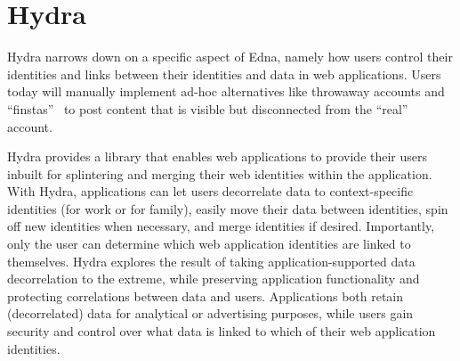 \begin{comment}

Edna is complementary to existing data protection mechanisms. For example, we
combine Edna with an encrypted database to achieve stronger guarantees.
Ednacrypt simultaneously protects against database server compromises even for
unsealed data and adds Edna's protections for sealed data to encrypted
databases, which have no built-in support for removing sensitive data without
breaking the application.

To investigate the need for Edna as a new system, we tried to realize Edna's
functionality atop Qapla~\cite{qapla}, a framework that rewrites SQL queries to
conform to access control policies. We found that Qapla requires invasive
application changes, its abstractions are awkward for sealing and revealing, and
Qapla's query rewriting slows down common queries.


\end{comment}


\section{Hydra}

Hydra narrows down on a specific aspect of Edna, namely how users control their
identities and links between their identities and data in web applications.
Users today will manually implement ad-hoc alternatives like throwaway accounts
and ``finstas''~\cite{reddit:throwaway, nytimes:finsta} to post content that is
visible but disconnected from the ``real'' account. 

Hydra provides a library that enables web applications to provide their
users inbuilt for splintering and merging their web identities within the
application. With Hydra, applications can let users decorrelate data to
context-specific identities (\eg for work or for family), easily
move their data between identities, spin off new identities when necessary, and
merge identities if desired. Importantly, only the user can determine which
web application identities are linked to themselves.
%
Hydra explores the result of taking application-supported data
decorrelation to the extreme, while preserving application functionality and
protecting correlations between data and users. Applications both retain
(decorrelated) data for \eg analytical or advertising purposes, while users gain
security and control over what data is linked to which of their web application
identities.



